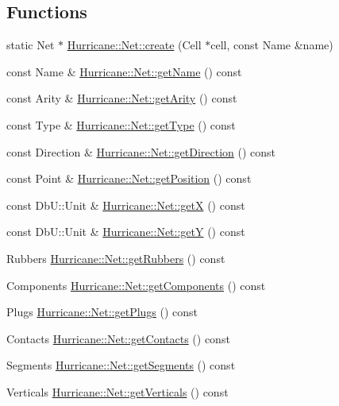 \subsection*{Functions}
\begin{DoxyCompactItemize}
\item 
static Net $\ast$ \hyperlink{group__NetClass_gac1524cea15e8eacbf992c0cfb9e481db}{Hurricane\-::\-Net\-::create} (Cell $\ast$cell, const Name \&name)
\item 
const Name \& \hyperlink{group__NetClass_gafdea21658591675525b288fcacccde77}{Hurricane\-::\-Net\-::get\-Name} () const 
\item 
const Arity \& \hyperlink{group__NetClass_ga81719535491a8c9e50c96ad185eabcba}{Hurricane\-::\-Net\-::get\-Arity} () const 
\item 
const Type \& \hyperlink{group__NetClass_ga3c4b7797fb10571585ebf891063a8398}{Hurricane\-::\-Net\-::get\-Type} () const 
\item 
const Direction \& \hyperlink{group__NetClass_gad075d861764b6e2d3cbcebf94e184a97}{Hurricane\-::\-Net\-::get\-Direction} () const 
\item 
const Point \& \hyperlink{group__NetClass_ga42772f8b1bf8073044fbbf0cf705aa62}{Hurricane\-::\-Net\-::get\-Position} () const 
\item 
const Db\-U\-::\-Unit \& \hyperlink{group__NetClass_ga232572eba91478515bab9cc0a497ce96}{Hurricane\-::\-Net\-::get\-X} () const 
\item 
const Db\-U\-::\-Unit \& \hyperlink{group__NetClass_ga071f6bdd32c0b993780df86952c798f5}{Hurricane\-::\-Net\-::get\-Y} () const 
\item 
Rubbers \hyperlink{group__NetClass_ga39f89ecd9215a234a8fb65fe9285b1d8}{Hurricane\-::\-Net\-::get\-Rubbers} () const 
\item 
Components \hyperlink{group__NetClass_ga47c0a2dff87f932b6c27222b1b2d3e11}{Hurricane\-::\-Net\-::get\-Components} () const 
\item 
Plugs \hyperlink{group__NetClass_ga2c8340816860d069b95214b35a58cceb}{Hurricane\-::\-Net\-::get\-Plugs} () const 
\item 
Contacts \hyperlink{group__NetClass_ga330a1b2341eaf9ebbcd4b7ea1234f039}{Hurricane\-::\-Net\-::get\-Contacts} () const 
\item 
Segments \hyperlink{group__NetClass_ga7fedf8227eccd3cf6f2f5e4ee26ed953}{Hurricane\-::\-Net\-::get\-Segments} () const 
\item 
Verticals \hyperlink{group__NetClass_ga82cf6b0f2f910d4777554991503d603c}{Hurricane\-::\-Net\-::get\-Verticals} () const 

\end{DoxyCompactItemize}
